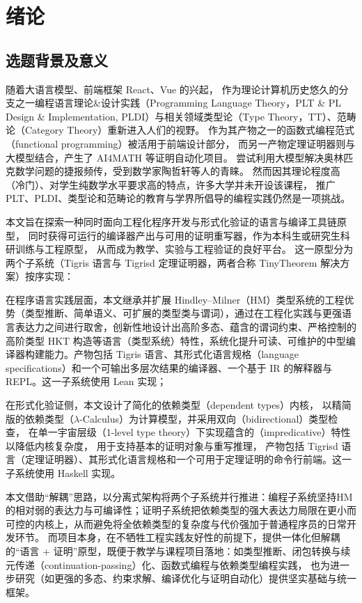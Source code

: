 \chapter{绪论}
\section{选题背景及意义}
随着大语言模型、前端框架 React、Vue 的兴起，
作为理论计算机历史悠久的分支之一编程语言理论\&设计实践（Programming Language Theory，PLT \& PL Design \& Implementation, PLDI）与相关领域类型论（Type Theory，TT）、范畴论（Category Theory）重新进入人们的视野。
作为其产物之一的函数式编程范式（functional programming）被活用于前端设计部分，
而另一产物定理证明器则与大模型结合，产生了 AI4MATH 等证明自动化项目。
尝试利用大模型解决奥林匹克数学问题的捷报频传，受到数学家陶哲轩等人的青睐。
然而因其理论程度高（冷门）、对学生纯数学水平要求高的特点，许多大学并未开设该课程，
推广 PLT、PLDI、类型论和范畴论的教育与学界所倡导的编程实践仍然是一项挑战。

本文旨在探索一种同时面向工程化程序开发与形式化验证的语言与编译工具链原型，
同时获得可运行的编译器产出与可用的证明重写器，作为本科生或研究生科研训练与工程原型，
从而成为教学、实验与工程验证的良好平台。
这一原型分为两个子系统（Tigris 语言与 Tigrisd 定理证明器，两者合称 TinyTheorem 解决方案）按序实现：

在程序语言实践层面，本文继承并扩展 Hindley–Milner（HM）类型系统的工程优势（类型推断、简单语义、可扩展的类型类与谓词），通过在工程化实践与更强语言表达力之间进行取舍，创新性地设计出高阶多态、蕴含的谓词约束、严格控制的高阶类型 HKT 构造等语言（类型系统）特性，系统化提升可读、可维护的中型编译器构建能力。产物包括 Tigris 语言、其形式化语言规格（language specifications）和一个可输出多层次结果的编译器、一个基于 IR 的解释器与 REPL。这一子系统使用 Lean 实现；

在形式化验证侧，本文设计了简化的依赖类型（dependent types）内核，
以精简版的依赖类型\lambdacalc（$\lambda$-Calculus）为计算模型，并采用双向（bidirectional）类型检查，
在单一宇宙层级（1-level type theory）下实现蕴含的（impredicative）特性以降低内核复杂度，
用于支持基本的证明对象与重写推理，
产物包括 Tigrisd 语言（定理证明器）、其形式化语言规格和一个可用于定理证明的命令行前端。这一子系统使用 Haskell 实现。

本文借助“解耦”思路，以分离式架构将两个子系统并行推进：编程子系统坚持HM的相对弱的表达力与可编译性；证明子系统把依赖类型的强大表达力局限在更小而可控的内核上，从而避免将全依赖类型的复杂度与代价强加于普通程序员的日常开发环节。
而项目本身，在不牺牲工程实践友好性的前提下，提供一体化但解耦的“语言 + 证明”原型，既便于教学与课程项目落地：如类型推断、闭包转换与续元传递（continuation-passing）化、函数式编程与依赖类型编程实践，
也为进一步研究（如更强的多态、约束求解、编译优化与证明自动化）提供坚实基础与统一框架。

